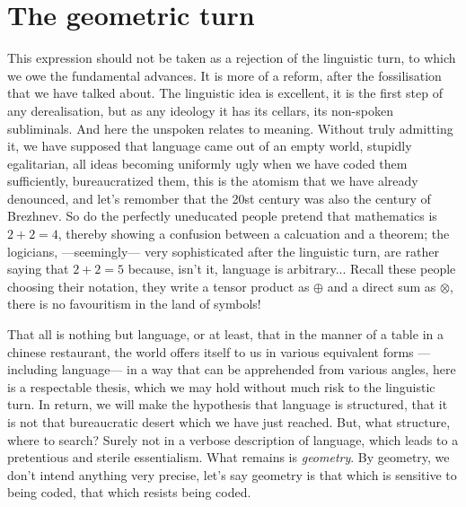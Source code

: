 \documentclass{article}
\begin{document}
\section{The geometric turn}
This expression should not be taken as a rejection of the linguistic turn, to which we owe the fundamental advances. It is more of a reform, after the fossilisation that we have talked about. The linguistic idea is excellent, it is the first step of any derealisation, but as any ideology it has its cellars, its non-spoken subliminals. And here the unspoken relates to meaning. Without truly admitting it, we have supposed that language came out of an empty world, stupidly egalitarian, all ideas becoming uniformly ugly when we have coded them sufficiently, bureaucratized them, this is the atomism that we have already denounced, and let's remomber that the 20st century was also the century of Brezhnev. So do the perfectly uneducated people pretend that mathematics is $2+2=4$, thereby showing a confusion between a calcuation and a theorem; the logicians, ---seemingly--- very sophisticated after the linguistic turn, are rather saying that $2+2=5$ because, isn't it, language is arbitrary... Recall these people choosing their notation, they write a tensor product as $\oplus$ and a direct sum as $\otimes$, there is no favouritism in the land of symbols!

That all is nothing but language, or at least, that in the manner of a table in a chinese restaurant, the world offers itself to us in various equivalent forms ---including language--- in a way that can be apprehended from various angles, here is a respectable thesis, which we may hold without much risk to the linguistic turn. In return, we will make the hypothesis that language is structured, that it is not that bureaucratic desert which we have just reached. But, what structure, where to search? Surely not in a verbose description of language, which leads to a pretentious and sterile essentialism. What remains is \emph{geometry}. By geometry, we don't intend anything very precise, let's say geometry is that which is sensitive to being coded, that which resists being coded.
\end{document}
